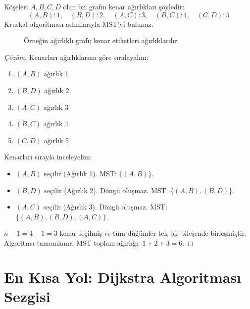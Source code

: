 \begin{example}
Köşeleri $A, B, C, D$ olan bir grafın kenar ağırlıkları şöyledir:
\[
(A, B): 1, \quad (B, D): 2, \quad (A, C): 3, \quad (B, C): 4, \quad (C, D): 5
\]
Kruskal algoritması adımlarıyla MST'yi bulunuz.

\begin{figure}[ht]
\centering
{}
\caption{Örneğin ağırlıklı grafı; kenar etiketleri ağırlıklardır.}
\end{figure}

\begin{proof}[Çözüm]
Kenarları ağırlıklarına göre sıralayalım:
\begin{enumerate}
    \item $(A, B)$ ağırlık 1
    \item $(B, D)$ ağırlık 2
    \item $(A, C)$ ağırlık 3
    \item $(B, C)$ ağırlık 4
    \item $(C, D)$ ağırlık 5
\end{enumerate}

Kenarları sırayla inceleyelim:
\begin{itemize}
    \item $(A, B)$ seçilir (Ağırlık 1). MST: $\{(A, B)\}$.
    \item $(B, D)$ seçilir (Ağırlık 2). Döngü oluşmaz. MST: $\{(A, B), (B, D)\}$.
    \item $(A, C)$ seçilir (Ağırlık 3). Döngü oluşmaz. MST: $\{(A, B), (B, D), (A, C)\}$.
\end{itemize}
$n-1 = 4-1 = 3$ kenar seçilmiş ve tüm düğümler tek bir bileşende birleşmiştir.
Algoritma tamamlanır. MST toplam ağırlığı: $1 + 2 + 3 = 6$.
\end{proof}
\end{example}

\section{En Kısa Yol: Dijkstra Algoritması Sezgisi}


